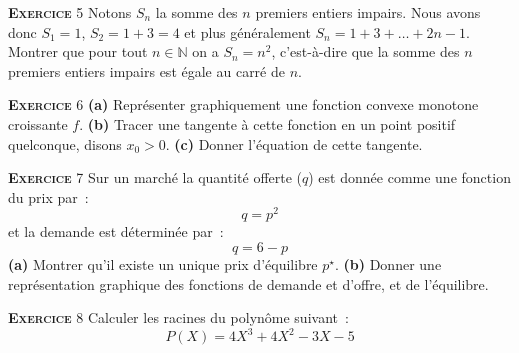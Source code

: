 \documentclass[10pt,a4paper,notitlepage,twocolumn]{article}
\newcommand{\exercise}[1]{\textsc{\textbf{Exercice}} #1}
\newcommand{\question}[1]{\textbf{(#1)}}
\begin{document}
\bigskip

\exercise{5} Notons $S_n$ la somme des $n$ premiers entiers impairs. Nous avons donc $S_1 = 1$, $S_2 = 1 + 3 = 4$ et plus généralement $S_n = 1+3+\dots+2n-1$. Montrer que pour tout $n\in\mathbb N$ on a $S_n = n^2$, c'est-à-dire que la somme des $n$ premiers entiers impairs est égale au carré de $n$.  

\bigskip

\exercise{6} \question{a} Représenter graphiquement une fonction convexe monotone croissante $f$. \question{b} Tracer une tangente à cette fonction en un point positif quelconque, disons $x_{0}>0$. \question{c} Donner l'équation de cette tangente.

\bigskip

\exercise{7} Sur un marché la quantité offerte ($q$) est donnée comme
une fonction du prix par~:
\[
q = p^2
\]
et la demande est déterminée par~:
\[
q = 6-p
\]
\question{a} Montrer qu'il existe un unique prix d'équilibre
$p^{\star}$. \question{b} Donner une représentation graphique des
fonctions de demande et d'offre, et de l'équilibre.

\bigskip

\exercise{8} Calculer les racines du polynôme suivant~: 
\[
P(X) = 4X^3+4X^2-3X-5
\]
\end{document}
